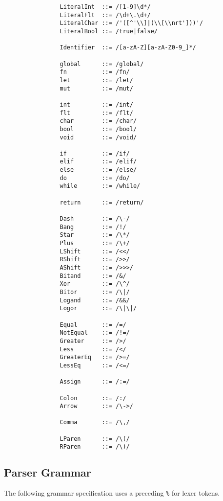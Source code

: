 \documentclass{article}
\begin{document}
			\begin{verbatim}
				LiteralInt  ::= /[1-9]\d*/
				LiteralFlt  ::= /\d+\.\d+/
				LiteralChar ::= /'([^'\\]|(\\[\\nrt']))'/
				LiteralBool ::= /true|false/
				
				Identifier  ::= /[a-zA-Z][a-zA-Z0-9_]*/
				
				global      ::= /global/
				fn          ::= /fn/
				let         ::= /let/
				mut         ::= /mut/
				
				int         ::= /int/
				flt         ::= /flt/
				char        ::= /char/
				bool        ::= /bool/
				void        ::= /void/
				
				if          ::= /if/
				elif        ::= /elif/
				else        ::= /else/
				do          ::= /do/
				while       ::= /while/
				
				return      ::= /return/
				
				Dash        ::= /\-/
				Bang        ::= /!/
				Star        ::= /\*/
				Plus        ::= /\+/
				LShift      ::= /<</
				RShift      ::= />>/
				AShift      ::= />>>/
				Bitand      ::= /&/
				Xor         ::= /\^/
				Bitor       ::= /\|/
				Logand      ::= /&&/
				Logor       ::= /\|\|/
				
				Equal       ::= /=/
				NotEqual    ::= /!=/
				Greater     ::= />/
				Less        ::= /</
				GreaterEq   ::= />=/
				LessEq      ::= /<=/
				
				Assign      ::= /:=/
				
				Colon       ::= /:/
				Arrow       ::= /\->/
				
				Comma       ::= /\,/
				
				LParen      ::= /\(/
				RParen      ::= /\)/
			\end{verbatim}
			
		\subsection{Parser Grammar}
		
			The following grammar specification uses a preceding \texttt{\%} for lexer tokens.
		
\end{document}
